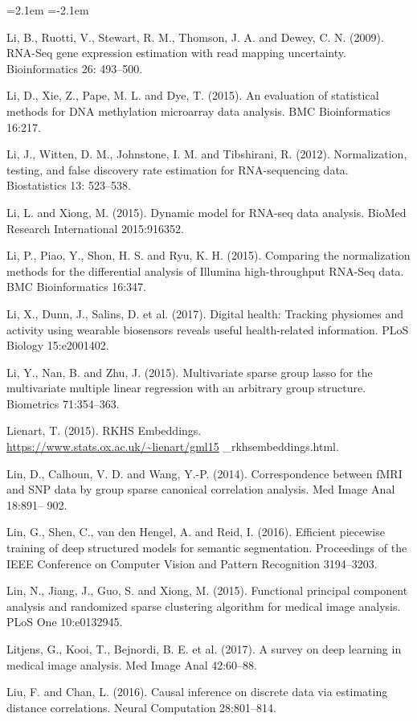 \begin{list}{}{\leftmargin=2.1em  
  \itemindent=-2.1em \parsep=0pt \itemsep=2pt \topsep=0pt}
\item Li, B., Ruotti, V., Stewart, R. M., Thomson, J. A. and Dewey, C. N. (2009). RNA-Seq gene expression estimation with read mapping uncertainty. Bioinformatics 26: 493--500.
\item Li, D., Xie, Z., Pape, M. L. and Dye, T. (2015). An evaluation of statistical methods for DNA methylation microarray data analysis. BMC Bioinformatics 16:217.
\item Li, J., Witten, D. M., Johnstone, I. M. and Tibshirani, R. (2012). Normalization, testing, and false discovery rate estimation for RNA-sequencing data. Biostatistics 13: 523--538.
\item Li, L. and Xiong, M. (2015). Dynamic model for RNA-seq data analysis. BioMed Research International 2015:916352.
\item Li, P., Piao, Y., Shon, H. S. and Ryu, K. H. (2015). Comparing the normalization methods for the differential analysis of Illumina high-throughput RNA-Seq data. BMC Bioinformatics 16:347.
\item Li, X., Dunn, J., Salins, D. et al. (2017). Digital health: Tracking physiomes and activity using wearable biosensors reveals useful health-related information. PLoS Biology 15:e2001402.
\item Li, Y., Nan, B. and Zhu, J. (2015). Multivariate sparse group lasso for the multivariate multiple linear regression with an arbitrary group structure. Biometrics 71:354--363.
\item Lienart, T. (2015). RKHS Embeddings. \url{https://www.stats.ox.ac.uk/~lienart/gml15} \_rkhsembeddings.html.
\item Lin, D., Calhoun, V. D. and Wang, Y.-P. (2014). Correspondence between fMRI and SNP data by group sparse canonical correlation analysis. Med Image Anal 18:891-- 902.
\item Lin, G., Shen, C., van den Hengel, A. and Reid, I. (2016). Efficient piecewise training of deep structured models for semantic segmentation. Proceedings of the IEEE Conference on Computer Vision and Pattern Recognition 3194--3203.
\item Lin, N., Jiang, J., Guo, S. and Xiong, M. (2015). Functional principal component analysis and randomized sparse clustering algorithm for medical image analysis. PLoS One 10:e0132945.
\item Litjens, G., Kooi, T., Bejnordi, B. E. et al. (2017). A survey on deep learning in medical image analysis. Med Image Anal 42:60--88.
\item Liu, F. and Chan, L. (2016). Causal inference on discrete data via estimating distance correlations. Neural Computation 28:801--814.

\end{list}
